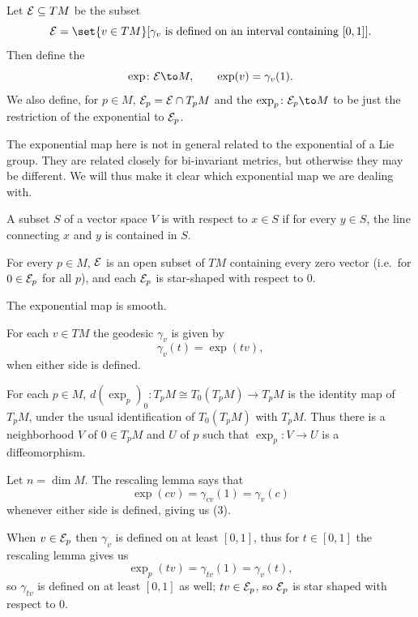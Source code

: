 \eproof


Let ${{\cal E}}\subseteq TM$ be the subset
$$ \E  = \set{v\in TM}[\hbox{$\gamma_v$ is defined on an interval containing $[0,1]$}] . $$
Then define the 
$$ \exp\colon\E\to M,\qquad \exp(v) = \gamma_v(1) . $$
We also define, for $p\in M$, ${{\cal E}}_p={{\cal E}}\cap T_pM$ and the  $\exp_p\colon\E_p\to M$ to be just the
restriction of the exponential to ${{\cal E}}_p$.

\bnote

    The exponential map here is not in general related to the exponential of a Lie group.
    They are related closely for bi-invariant metrics, but otherwise they may be different.
    We will thus make it clear which exponential map we are dealing with.

\enote

\bdefn

    A subset $S$ of a vector space $V$ is  with respect to $x\in S$ if for every $y\in S$, the line connecting $x$ and
    $y$ is contained in $S$.

\edefn

\bprop

    \benum
        \item For every $p\in M$, ${{\cal E}}$ is an open subset of $TM$ containing every zero vector (i.e.\ for $0\in{{\cal E}}_p$ for all $p$),
        and each ${{\cal E}}_p$ is star-shaped with respect to $0$.
        \item The exponential map is smooth.
        \item For each $v\in TM$ the geodesic $\gamma_v$ is given by
        $$ \gamma_v(t) = \exp(tv) , $$
        when either side is defined.
        \item For each $p\in M$, $d(\exp_p)_0\colon T_pM\cong T_0(T_pM)\to T_pM$ is the identity map of $T_pM$, under the usual identification of
        $T_0(T_pM)$ with $T_pM$.
        Thus there is a neighborhood $V$ of $0\in T_pM$ and $U$ of $p$ such that $\exp_p\colon V\to U$ is a diffeomorphism.
    \eenum

\eprop

\bproof

    Let $n=\dim M$.
    The rescaling lemma says that
    $$ \exp(cv) = \gamma_{cv}(1) = \gamma_v(c) $$
    whenever either side is defined, giving us (3).

    When $v\in{{\cal E}}_p$ then $\gamma_v$ is defined on at least $[0,1]$, thus for $t\in[0,1]$ the rescaling lemma gives us
    $$ \exp_p(tv) = \gamma_{tv}(1) = \gamma_v(t) , $$
    so $\gamma_{tv}$ is defined on at least $[0,1]$ as well; $tv\in{{\cal E}}_p$, so ${{\cal E}}_p$ is star shaped with respect to $0$.

